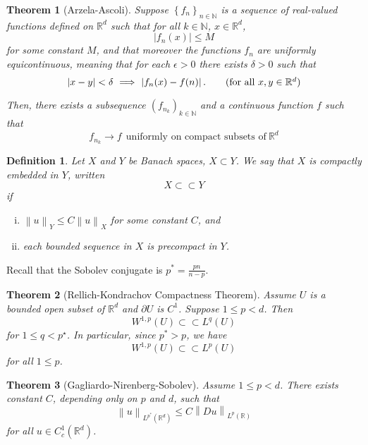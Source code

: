 \documentclass{article}
\newcommand{\Reals}{\mathbb{R}}
\newcommand{\norm}[1]{\left\lVert#1\right\rVert}
\newcommand{\abs}[1]{\left \lvert #1 \right \rvert}
\newcommand{\set}[1]{\left\{#1\right\}}
\newcommand{\seq}[1]{\set{#1}_{n \in \N}}
\newcommand{\Naturals}{\mathbb{N}}
\newcommand{\N}{\mathbb{N}}
\newcommand{\1}{\mathbf{1}}
\theoremstyle{alden}
\newtheorem{definition}{Definition}[section]
\theoremstyle{aldenthm}
\newtheorem{theorem}{Theorem}
\theoremstyle{remark}
\begin{document}
\begin{theorem}[Arzela-Ascoli]
	\label{thm: arzela_ascoli}
	Suppose $\seq{f_n}$ is a sequence of real-valued functions defined on $\Reals^d$ such that for all $k \in \Naturals$, $x \in \Reals^d$,
	\begin{equation*}
	\abs{f_n(x)} \leq M
	\end{equation*}
	for some constant $M$, and that moreover the functions $f_n$ are \emph{uniformly equicontinuous}, meaning that for each $\epsilon > 0$ there exists $\delta > 0$ such that 
	\begin{equation*}
	\abs{x - y} < \delta~ \Longrightarrow~ \abs{f_n(x) - f(n)}. \tag{for all $x,y \in \Reals^d$}
	\end{equation*}
	
	Then, there exists a subsequence $(f_{n_k})_{k \in \Naturals}$ and a continuous function $f$ such that
	\begin{equation*}
	f_{n_k} \to f~~ \textrm{uniformly on compact subsets of}~ \Reals^d
	\end{equation*}
\end{theorem}

\begin{definition}
	Let $X$ and $Y$ be Banach spaces, $X \subset Y$. We say that $X$ is \emph{compactly embedded} in $Y$, written
	\begin{equation*}
	X \subset \subset Y
	\end{equation*}
	if 
	\begin{enumerate}[(i)]
		\item $\norm{u}_Y \leq C \norm{u}_X$ for some constant $C$, and
		\item each bounded sequence in $X$ is precompact in $Y$. 
	\end{enumerate}
\end{definition}

Recall that the Sobolev conjugate is $p^*= \frac{pn}{n - p}$.

\begin{theorem}[Rellich-Kondrachov Compactness Theorem]
	\label{thm: compact_embedding}
	Assume $U$ is a bounded open subset of $\Reals^d$ and $\partial U$ is $C^1$. Suppose $1 \leq p < d$. Then
	\begin{equation*}
	W^{1,p}(U) \subset \subset L^q(U)
	\end{equation*}
	for $1 \leq q < p^{\star}$. In particular, since $p^{*} > p$, we have
	\begin{equation*}
	W^{1,p}(U) \subset \subset L^p(U)
	\end{equation*}
	for all $1 \leq p$.
\end{theorem}

\begin{theorem}[Gagliardo-Nirenberg-Sobolev]
	\label{thm: poincare}
	Assume $1 \leq p < d$. There exists constant $C$, depending only on $p$ and $d$, such that
	\begin{equation*}
	\norm{u}_{L^{p^*}(\Reals^d)} \leq C \norm{D u}_{L^{p}(\Reals)}
	\end{equation*}
	for all $u \in C_c^1(\Reals^d)$. 
\end{theorem}
\end{document}
